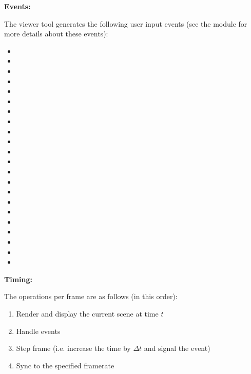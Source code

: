 {\bf Events:}

The viewer tool generates the following user input events (see the
module  for more details about these events):

\begin{itemize}
\item {}
\item {}
\item {}
\item {}
\item {}
\item {}
\item {}
\item {}
\item {}
\item {}
\item {}
\item {}
\item {}
\item {}
\item {}
\item {}
\item {}
\item {}
\item {}
\item {}
\item {}
\item {}
\end{itemize}

{\bf Timing:}

The operations per frame are as follows (in this order):

\begin{enumerate}
\item Render and display the current scene at time $t$
\item Handle events
\item Step frame (i.e. increase the time by $\Delta t$ and signal the
   event)
\item Sync to the specified framerate
\end{enumerate}
